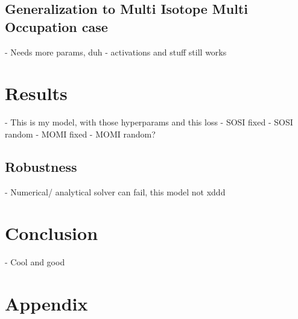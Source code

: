 \subsection{Generalization to Multi Isotope Multi Occupation case}
- Needs more params, duh
- activations and stuff still works

\section{Results}
- This is my model, with those hyperparams and this loss
- SOSI fixed
- SOSI random
- MOMI fixed
- MOMI random?
\subsection{Robustness}
- Numerical/ analytical solver can fail, this model not xddd
\section{Conclusion}
- Cool and good

\section{Appendix}



